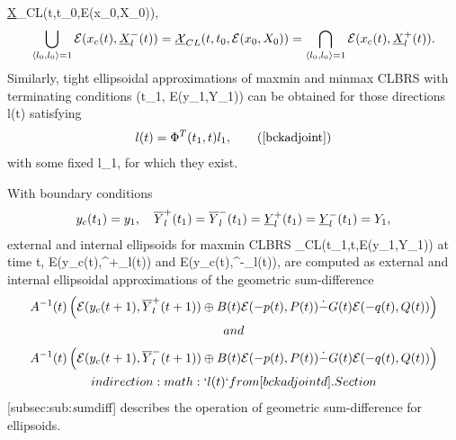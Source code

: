 \documentclass[letterpaper,10pt,english]{sphinxmanual}
\begin{document}
\underline{{\mathcal X}}_{CL}(t,t_0,{\mathcal E}(x_0,X_0)),
\begin{gather}
\begin{split}\bigcup_{\langle l_0,l_0\rangle=1}{\mathcal E}(x_c(t),\underline{X}^-_l(t)) =
\underline{{\mathcal X}}_{CL}(t,t_0,{\mathcal E}(x_0,X_0)) =
\bigcap_{\langle l_0,l_0\rangle=1}{\mathcal E}(x_c(t),\underline{X}^+_l(t)).\end{split}\notag
\end{gather}
Similarly, tight ellipsoidal approximations of maxmin and minmax CLBRS
with terminating conditions (t_1, {\mathcal E}(y_1,Y_1)) can be
obtained for those directions l(t) satisfying
\begin{gather}
\begin{split}l(t) = \Phi^T(t_1,t)l_1,
\tag*{(\ref{bckadjoint})}
\label{bckadjointd}\end{split}\notag
\end{gather}
with some fixed l_1, for which they exist.

With boundary conditions
\begin{gather}
\begin{split}y_c(t_1)=y_1, ~~~ \overline{Y}^+_l(t_1)=\overline{Y}^-_l(t_1)=\underline{Y}^+_l(t_1)=\underline{Y}^-_l(t_1)=Y_1,
\label{bndconds}\end{split}\notag
\end{gather}
external and internal ellipsoids for maxmin CLBRS
_{CL}(t_1,t,{\mathcal E}(y_1,Y_1)) at
time t, {\mathcal E}(y_c(t),^+_l(t)) and
{\mathcal E}(y_c(t),^-_l(t)), are computed as
external and internal ellipsoidal approximations of the geometric
sum-difference
\begin{gather}
\begin{split}  A^{-1}(t)\left(
  {\mathcal E}(y_c(t+1),\overline{Y}^+_l(t+1)) \oplus B(t){\mathcal E}(-p(t),P(t))
  \dot{-}G(t){\mathcal E}(-q(t),Q(t))
  \right)\end{split}\notag\\\begin{split}and\end{split}\notag
\end{gather}\begin{gather}
\begin{split}  A^{-1}(t)\left(
  {\mathcal E}(y_c(t+1),\overline{Y}^-_l(t+1)) \oplus B(t){\mathcal E}(-p(t),P(t))
  \dot{-}G(t){\mathcal E}(-q(t),Q(t))
  \right)\end{split}\notag\\\begin{split}in direction :math:`l(t)` from [bckadjointd]. Section\end{split}\notag
\end{gather}
{[}subsec:sub:\emph{s}umdiff{]} describes the operation of geometric
sum-difference for ellipsoids.
\end{document}
